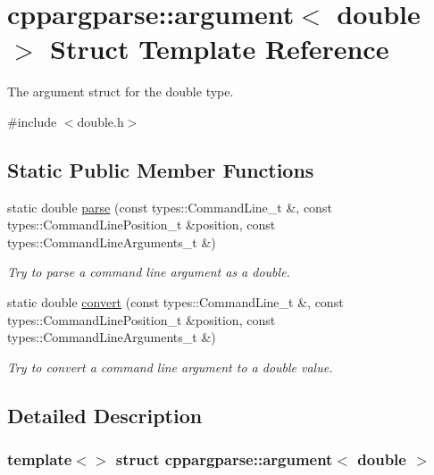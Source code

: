 \hypertarget{structcppargparse_1_1argument_3_01double_01_4}{}\section{cppargparse\+:\+:argument$<$ double $>$ Struct Template Reference}
\label{structcppargparse_1_1argument_3_01double_01_4}


The argument struct for the double type.  




{\ttfamily \#include $<$double.\+h$>$}

\subsection*{Static Public Member Functions}
\begin{DoxyCompactItemize}
\item 
static double \hyperlink{structcppargparse_1_1argument_3_01double_01_4_aa587b4a64888fd195328d2491f893bc5}{parse} (const types\+::\+Command\+Line\+\_\+t \&, const types\+::\+Command\+Line\+Position\+\_\+t \&position, const types\+::\+Command\+Line\+Arguments\+\_\+t \&)
\begin{DoxyCompactList}\small\item\em Try to parse a command line argument as a double. \end{DoxyCompactList}\item 
static double \hyperlink{structcppargparse_1_1argument_3_01double_01_4_a19756d869b671553629d509f18549903}{convert} (const types\+::\+Command\+Line\+\_\+t \&, const types\+::\+Command\+Line\+Position\+\_\+t \&position, const types\+::\+Command\+Line\+Arguments\+\_\+t \&)
\begin{DoxyCompactList}\small\item\em Try to convert a command line argument to a double value. \end{DoxyCompactList}\end{DoxyCompactItemize}


\subsection{Detailed Description}
\subsubsection*{template$<$$>$\newline
struct cppargparse\+::argument$<$ double $>$}

